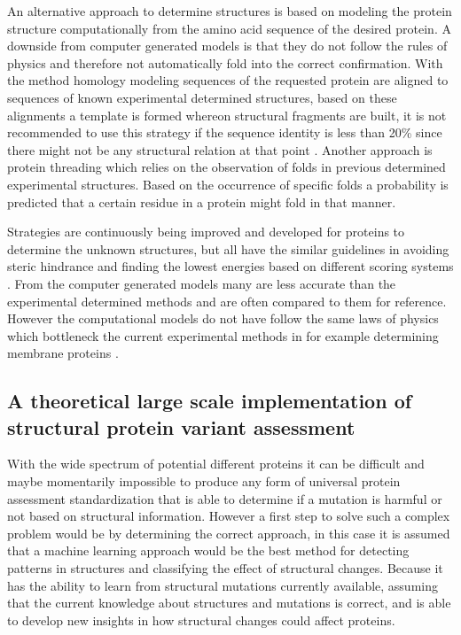 An alternative approach to determine structures is based on modeling the protein structure computationally from the amino acid sequence of the desired protein. A downside from computer generated models is that they do not follow the rules of physics and therefore not automatically fold into the correct confirmation. With the method homology modeling sequences of the requested protein are aligned to sequences of known experimental determined structures, based on these alignments a template is formed whereon structural fragments are built, it is not recommended to use this strategy if the sequence identity is less than 20\% since there might not be any structural relation at that point \cite{}.
Another approach is protein threading which relies on the observation of folds in previous determined experimental structures. Based on the occurrence of specific folds a probability is predicted that a certain residue in a protein might fold in that manner. 

Strategies are continuously being improved and developed for proteins to determine the unknown structures, but all have the similar guidelines in avoiding steric hindrance \cite{} and finding the lowest energies based on different scoring systems \cite{}. From the computer generated models many are less accurate than the experimental determined methods and are often compared to them for reference. However the computational models do not have follow the same laws of physics which bottleneck the current experimental methods in for example determining membrane proteins \cite{}.

\subsection{A theoretical large scale implementation of structural protein variant assessment}
With the wide spectrum of potential different proteins it can be difficult and maybe momentarily impossible to produce any form of universal protein assessment standardization that is able to determine if a mutation is harmful or not based on structural information. However a first step to solve such a complex problem would be by determining the correct approach, in this case it is assumed that a machine learning approach would be the best method for detecting patterns in structures and classifying the effect of structural changes. Because it has the ability to learn from structural mutations currently available, assuming that the current knowledge about structures and mutations is correct, and is able to develop new insights in how structural changes could affect proteins. 

